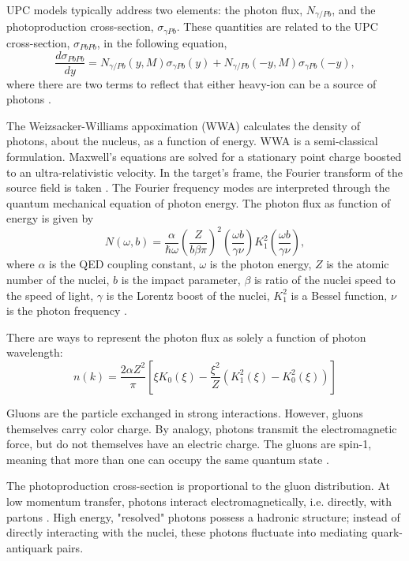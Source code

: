 UPC models typically address two elements: the photon flux, $N_{\gamma / Pb}$, and the photoproduction cross-section, $\sigma_{\gamma Pb}$. These quantities are related to the UPC cross-section, $\sigma_{PbPb}$, in the following equation,
\begin{equation}
\frac{d \sigma_{PbPb}}{dy} = N_{\gamma/Pb}(y,M)\sigma_{\gamma Pb}(y)+N_{\gamma/Pb}(-y,M)\sigma_{\gamma Pb}(-y),
\end{equation}
where there are two terms to reflect that either heavy-ion can be a source of photons \cite{Bertulani:2005ru}. 

The Weizsacker-Williams appoximation (WWA) calculates the density of photons, about the nucleus, as a function of energy. WWA is a semi-classical formulation. Maxwell's equations are solved for a stationary point charge boosted to an ultra-relativistic velocity. In the target's frame, the Fourier transform of the source field is taken \cite{directPhotonTheory}. The Fourier frequency modes are interpreted through the quantum mechanical equation of photon energy. The photon flux as function of energy is given by
\begin{equation}
N(\omega,b) = \frac{\alpha}{\hbar \omega}\left( \frac{Z}{b\beta\pi} \right)^2\left ( \frac{\omega b}{\gamma \nu} \right )K_1^2\left ( \frac{\omega b}{\gamma \nu} \right ) ,
\end{equation}
where $\alpha$ is the QED coupling constant, $\omega$ is the photon energy, $Z$ is the atomic number of the nuclei, $b$ is the impact parameter, $\beta$ is ratio of the nuclei speed to the speed of light, $\gamma$ is the Lorentz boost of the nuclei, $K_1^2$ is a Bessel function, $\nu$ is the photon frequency \cite{WWJackson}.

There are ways to represent the photon flux as solely a function of photon wavelength:
\begin{equation}
n(k) = \frac{2 \alpha Z^2}{\pi}\left [ \xi K_0(\xi) - \frac{\xi^2}{Z}(K_1^2(\xi)-K_0^2(\xi)) \right ]
\end{equation}

Gluons are the particle exchanged in strong interactions. However, gluons themselves carry color charge. By analogy, photons transmit the electromagnetic force, but do not themselves have an electric charge. The gluons are spin-1, meaning that more than one can occupy the same quantum state \cite{Hufner:1996jw}.

The photoproduction cross-section is proportional to the gluon distribution. At low momentum transfer, photons interact electromagnetically, i.e. directly, with partons \cite{photonALICE}. High energy, "resolved" photons possess a hadronic structure; instead of directly interacting with the nuclei, these photons fluctuate into mediating quark-antiquark pairs. 

